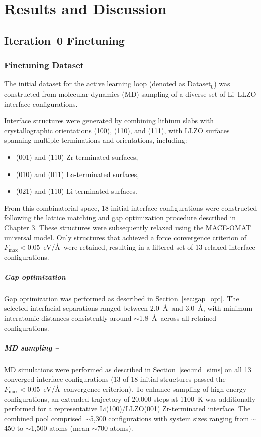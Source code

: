 \documentclass[12pt,a4paper,oneside]{book}
\begin{document}
\chapter{Results and Discussion}
\label{ch:results}
\section{Iteration~0 Finetuning}
\label{sec:results_it0}

\subsection{Finetuning Dataset}

The initial dataset for the active learning loop (denoted as Dataset$_0$) was constructed from molecular dynamics (MD) sampling of a diverse set of Li--LLZO interface configurations.

Interface structures were generated by combining lithium slabs with crystallographic orientations (100), (110), and (111), with LLZO surfaces spanning multiple terminations and orientations, including:
\begin{itemize}
    \item (001) and (110) Zr-terminated surfaces,
    \item (010) and (011) La-terminated surfaces,
    \item (021) and (110) Li-terminated surfaces.
\end{itemize}

From this combinatorial space, 18 initial interface configurations were constructed following the lattice matching and gap optimization procedure described in Chapter 3. These structures were subsequently relaxed using the MACE-OMAT universal model. Only structures that achieved a force convergence criterion of $F_{\max} < 0.05$~eV/\AA\ were retained, resulting in a filtered set of 13 relaxed interface configurations.

\paragraph{Gap optimization --}
Gap optimization was performed as described in Section~\ref{sec:gap_opt}. 
The selected interfacial separations ranged between 2.0~\AA\ and 3.0~\AA, 
with minimum interatomic distances consistently around $\sim$1.8~\AA\ across 
all retained configurations.

\paragraph{MD sampling --}
MD simulations were performed as described in Section~\ref{sec:md_sims} on all 
13 converged interface configurations (13 of 18 initial structures passed the 
$F_{\max} < 0.05$~eV/\AA\ convergence criterion). To enhance sampling of 
high-energy configurations, an extended trajectory of 20{,}000 steps at 1100~K 
was additionally performed for a representative Li(100)/LLZO(001) Zr-terminated 
interface. The combined pool comprised $\sim$5{,}300 configurations with system 
sizes ranging from $\sim$450 to $\sim$1{,}500 atoms (mean $\sim$700 atoms).
\end{document}
